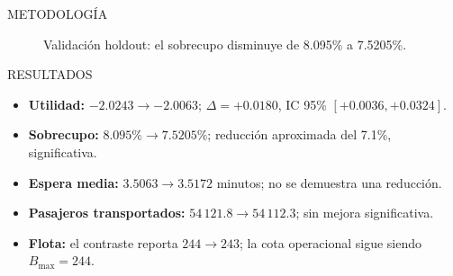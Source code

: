 \documentclass[final]{beamer}
\newlength{\colwidth}
\begin{document}
\begin{frame}[t]
\begin{columns}[t]
\begin{column}{\colwidth}
\begin{alertblock}{METODOLOGÍA}
        \begin{figure}[H]
          \centering
          \caption{Validación holdout: el sobrecupo disminuye de 8.095\% a 7.5205\%.}
          \label{Sobrecupo}
        \end{figure}




      \end{alertblock}

      \begin{block}{RESULTADOS}

        \begin{itemize}
          \item \textbf{Utilidad:} $-2.0243 \rightarrow -2.0063$; $\Delta=+0.0180$, IC 95\% $[+0.0036,+0.0324]$.
          \item \textbf{Sobrecupo:} $8.095\% \rightarrow 7.5205\%$; reducción aproximada del 7.1\%, significativa.
          \item \textbf{Espera media:} $3.5063 \rightarrow 3.5172$ minutos; no se demuestra una reducción.
          \item \textbf{Pasajeros transportados:} $54\,121.8 \rightarrow 54\,112.3$; sin mejora significativa.
          \item \textbf{Flota:} el contraste reporta $244 \rightarrow 243$; la cota operacional sigue siendo $B_{\max}=244$.
        \end{itemize}


\end{block}
\end{column}
\end{columns}
\end{frame}
\end{document}
